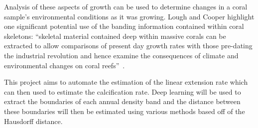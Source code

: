 Analysis of these aspects of growth can be used to determine changes in a coral sample's environmental conditions as it was growing. Lough and Cooper highlight one significant potential use of the banding information contained within coral skeletons: ``skeletal material contained deep within massive corals can be extracted to allow comparisons of present day growth rates with those pre-dating the industrial revolution and hence examine the consequences of climate and environmental changes on coral reefs''~\cite{lough2011new}.

This project aims to automate the estimation of the linear extension rate which can then used to estimate the calcification rate. Deep learning will be used to extract the boundaries of each annual density band and the distance between these boundaries will then be estimated using various methods based off of the Hausdorff distance.

